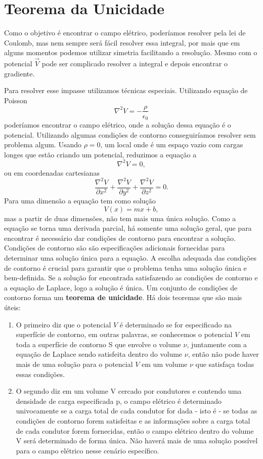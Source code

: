 \newpage\section{Teorema da Unicidade}Como o objetivo é encontrar o campo elétrico, poderíamos resolver pela lei de Coulomb, mas nem sempre será fácil resolver essa integral, por mais que em alguns momentos podemos utilizar simetria facilitando a resolução. Mesmo com o potencial $\Vec{V}$ pode ser complicado resolver a integral e depois encontrar o gradiente. 

Para resolver esse impasse utilizamos técnicas especiais. Utilizando equação de Poisson 
\[\nabla ^2 V = -\frac{\rho}{\epsilon_{0}}\]
poderíamos encontrar o campo elétrico, onde a solução dessa equação é o potencial. Utilizando algumas condições de contorno conseguiríamos resolver sem problema algum. Usando \(\rho = 0\), um local onde é um espaço vazio com cargas longes que estão criando um potencial, reduzimos a equação a 
\[\nabla^2 V=0,\]
ou em coordenadas cartesianas 
\[\frac{\nabla^2 V}{\partial x^2} + \frac{\nabla^2 V}{\partial y^2} + \frac{\nabla^2 V}{\partial z^2}=0. \]
 Para uma  dimensão a equação tem como solução 
\[ V(x) = mx +b,\]
mas a partir de duas dimensões, não tem mais uma única solução. Como a equação se torna uma derivada parcial, há somente uma solução geral, que para encontrar é necessário dar  condições de contorno para encontrar a solução. Condições de contorno são são especificações adicionais fornecidas para determinar uma solução única para a equação. A escolha adequada das condições de contorno é crucial para garantir que o problema tenha uma solução única e bem-definida. Se a solução for encontrada satisfazendo as condições de contorno e a equação de Laplace, logo a solução é única.  
Um conjunto de condições de contorno forma um \textbf{teorema de unicidade}. Há dois teoremas que são mais úteis: 
\begin{enumerate}
    \item O primeiro diz que o potencial $V$ é determinado se for especificado na superfície de contorno, em outras palavras, se conhecemos o potencial $V$ em toda a superfície de contorno S que envolve o volume $\nu$, juntamente com a equação de Laplace sendo satisfeita dentro do volume $\nu$, então não pode haver mais de uma solução para o potencial $V$ em um volume $\nu$ que satisfaça todas essas condições.
    \item O segundo diz em um volume V cercado por condutores e contendo uma densidade de carga especificada p, o campo elétrico é determinado univocamente se a carga total de cada condutor for dada - isto é - se todas as condições de contorno forem satisfeitas e as informações sobre a carga total de cada condutor forem fornecidas, então o campo elétrico dentro do volume V será determinado de forma única. Não haverá mais de uma solução possível para o campo elétrico nesse cenário específico.
\end{enumerate}